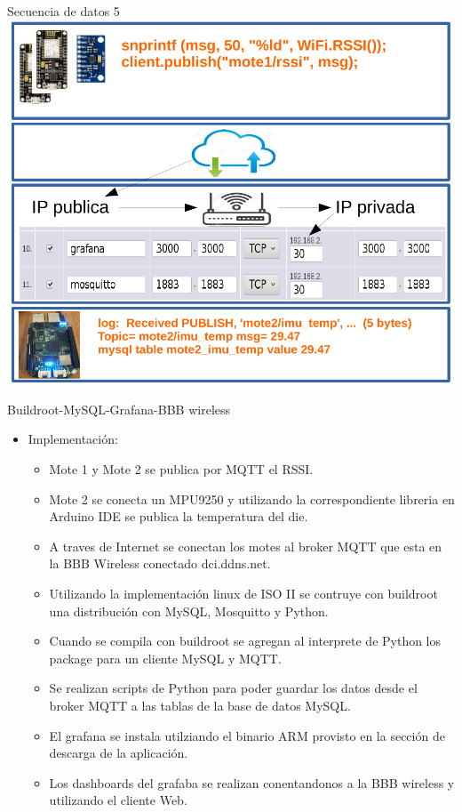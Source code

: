 \documentclass[aspectratio= 43]{beamer}
\begin{document}
\begin{frame}{Secuencia de datos 5}
   \centering \includegraphics [scale=0.62,page=5]{./visio/secuence.pdf}
\end{frame}

\begin{frame}{Buildroot-MySQL-Grafana-BBB wireless}
 \begin{itemize}
     \item{Implementación:}
      \begin{itemize}
               \item{Mote 1 y Mote 2 se publica por MQTT el RSSI.}
               \item{Mote 2 se conecta un MPU9250 y utilizando la correspondiente libreria en Arduino IDE se publica la temperatura del die.}
               \item{A traves de Internet se conectan los motes al broker MQTT que esta en la BBB Wireless conectado dci.ddns.net.}
	    \item{Utilizando la implementación linux de ISO II se contruye con buildroot una distribución con MySQL, Mosquitto y Python.}
	    \item{Cuando se compila con buildroot se agregan al interprete de Python los package para un cliente MySQL y MQTT.}
               \item{Se realizan scripts de Python para poder guardar los datos desde el broker MQTT a las tablas de la base de datos MySQL.}
               \item{El grafana se instala utilziando el binario ARM provisto en la sección de descarga de la aplicación.}
               \item{Los dashboards del grafaba se realizan conentandonos a la BBB wireless y utilizando el cliente Web.}
      \end{itemize}
  \end{itemize}
\end{frame}
\end{document}
